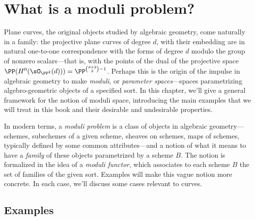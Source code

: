 \section{What is a moduli problem?}

Plane curves, the original objects studied by algebraic geometry, come naturally in a family: the projective plane curves of degree $d$, with their embedding
are in natural one-to-one correspondence with the forms of degree $d$ modulo the group of nonzero scalars---that is, with the points of the dual of the projective space
$ \PP(H^0(\sO_{\PP^2}(d)))=\PP^{\binom{d+2}{2}-1} $.
Perhaps this is the origin of the impulse in algebraic geometry to make 
 \emph{moduli}, or \emph{parameter spaces}---spaces parametrizing algebro-geometric objects of a specified sort. In this chapter, we'll give a general framework for the notion of moduli space, introducing the main examples that we will treat in this book and their desirable and undesirable properties.

In modern terms, a \emph{moduli problem} is a class of objects in algebraic geometry---schemes, subschemes of a given scheme, sheaves on schemes, maps of schemes, typically defined by some common attributes---and a notion of what it means to have a \emph{family} of these objects parametrized by a scheme $B$. The notion is formalized in the idea of a \emph{moduli functor}, 
which associates to each scheme $B$ the set of families of the given sort. Examples will make this vague notion more concrete. In each case, we'll discuss some cases relevant to curves.

\subsection{Examples}

